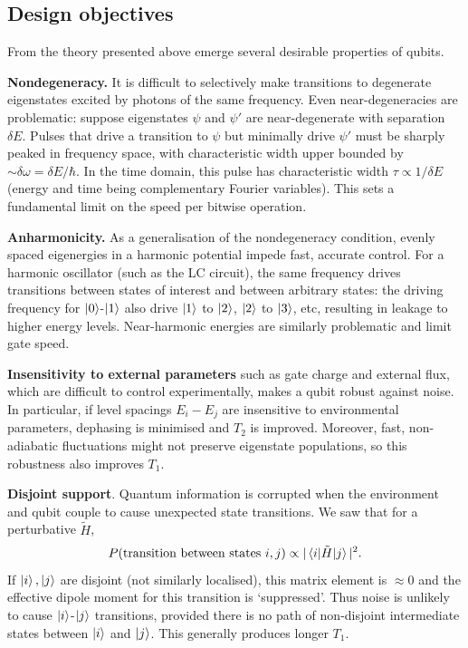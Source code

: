 \documentclass[11pt]{article}
\begin{document}

\subsection{Design objectives}

From the theory presented above emerge several desirable properties of qubits.

\textbf{Nondegeneracy.} It is difficult to selectively make transitions to degenerate eigenstates excited by photons of the same frequency. Even near-degeneracies are problematic: suppose eigenstates $\psi$ and $\psi'$ are near-degenerate with separation $\delta E$. Pulses that drive a transition to $\psi$ but minimally drive $\psi'$ must be sharply peaked in frequency space, with characteristic width upper bounded by $\sim \delta \omega = \delta E / \hbar$. In the time domain, this pulse has characteristic width $\tau \propto 1 / \delta E$ (energy and time being complementary Fourier variables). This sets a fundamental limit on the speed per bitwise operation.

\textbf{Anharmonicity.} As a generalisation of the nondegeneracy condition, evenly spaced eigenergies in a harmonic potential impede fast, accurate control. For a harmonic oscillator (such as the LC circuit), the same frequency drives transitions between states of interest and between arbitrary states: the driving frequency for $\ket{0}$-$\ket{1}$ also drive $\ket{1}$ to $\ket{2}$, $\ket{2}$ to $\ket{3}$, etc, resulting in leakage to higher energy levels. Near-harmonic energies are similarly problematic and limit gate speed.

\textbf{Insensitivity to external parameters} such as gate charge and external flux, which are difficult to control experimentally, makes a qubit robust against noise. In particular, if level spacings $E_i-E_j$ are insensitive to environmental parameters, dephasing is minimised and $T_2$ is improved. Moreover, fast, non-adiabatic fluctuations might not preserve eigenstate populations, so this robustness also improves $T_1$.

\textbf{Disjoint support}. Quantum information is corrupted when the environment and qubit couple to cause unexpected state transitions. We saw that for a perturbative $\tilde{H}$,
\begin{equation}
P(\text{transition between states } i, j) \propto |\matrixel{i}{\tilde{H}}{j}|^2.
\end{equation}
If $\ket{i}, \ket{j}$ are disjoint (not similarly localised), this matrix element is $\approx 0$ and the effective dipole moment for this transition is `suppressed'. Thus noise is unlikely to cause $\ket{i}$-$\ket{j}$ transitions, provided there is no path of non-disjoint intermediate states between $\ket{i}$ and $\ket{j}$. This generally produces longer $T_1$.
\end{document}
